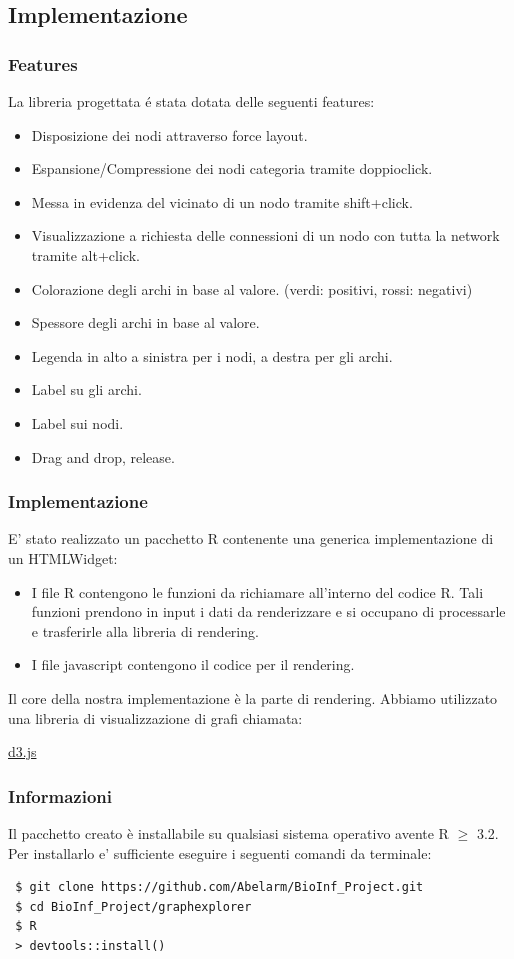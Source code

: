 \documentclass{beamer}
\begin{document}
\subsection{Implementazione}
\begin{frame}
\frametitle{Features}
La libreria progettata \'e stata dotata delle seguenti features:
\begin{itemize}
\item Disposizione dei nodi attraverso force layout.
\item Espansione/Compressione dei nodi categoria tramite doppioclick.
\item Messa in evidenza del vicinato di un nodo tramite shift+click.
\item Visualizzazione a richiesta delle connessioni di un nodo con tutta la network tramite alt+click.
\item Colorazione degli archi in base al valore. (verdi: positivi, rossi: negativi)
\item Spessore degli archi in base al valore.
\item Legenda in alto a sinistra per i nodi, a destra per gli archi.
\item Label su gli archi.
\item Label sui nodi.
\item Drag and drop, release.
\end{itemize}
\end{frame}

\begin{frame}
\frametitle{Implementazione}
E' stato realizzato un pacchetto R contenente una generica implementazione di un \alert{HTMLWidget}:
\begin{itemize}
	\item I file R contengono le funzioni da richiamare all'interno del codice R. Tali funzioni prendono in input i dati da renderizzare e si occupano di processarle e trasferirle alla libreria di rendering.
	\item I file javascript contengono il codice per il rendering.
\end{itemize}

Il core della nostra implementazione è la parte di rendering. Abbiamo utilizzato una libreria di visualizzazione di grafi chiamata:
\begin{center}
\href{http://d3js.org/}{d3.js}
\end{center}
\end{frame}

\begin{frame}[fragile]
\frametitle{Informazioni}
Il pacchetto creato è installabile su qualsiasi sistema operativo avente R $\geq$ 3.2.
Per installarlo e' sufficiente eseguire i seguenti comandi da terminale:
\begin{footnotesize}
\begin{lstlisting}
 $ git clone https://github.com/Abelarm/BioInf_Project.git
 $ cd BioInf_Project/graphexplorer
 $ R
 > devtools::install()
\end{lstlisting}
\end{footnotesize}
\end{frame}
\end{document}
